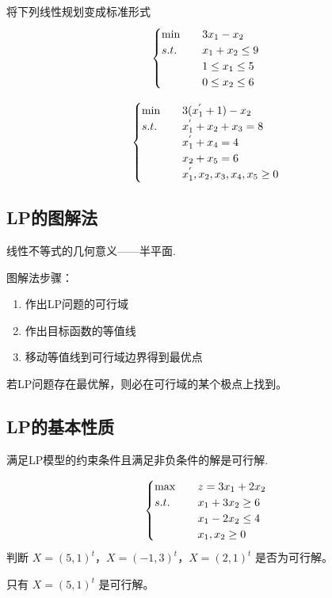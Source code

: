 \begin{example}
    将下列线性规划变成标准形式
    \[
        \begin{cases}
            \min \quad &3x_1 - x_2\\
            s.t. \quad &x_1 + x_2 \le 9\\
            &1 \le x_1 \le 5\\
            &0 \le x_2 \le 6
        \end{cases}  
    \]

    \answer
    \[
        \begin{cases}
            \min \quad &3(x_1^{'} + 1) - x_2\\
            s.t. \quad &x_1^{'} + x_2 + x_3 = 8\\
            &x_1^{'} + x_4 = 4\\
            &x_2 + x_5 = 6\\
            &x_1^{'}, x_2, x_3, x_4, x_5 \ge 0
        \end{cases}
    \]  
\end{example}

\subsection{LP的图解法}
\begin{note}
    线性不等式的几何意义——半平面.

    图解法步骤：
    \begin{enumerate}
        \item 作出LP问题的可行域
        \item 作出目标函数的等值线
        \item 移动等值线到可行域边界得到最优点
    \end{enumerate}
\end{note}

\begin{theorem}
    若LP问题存在最优解，则必在可行域的某个极点上找到。
\end{theorem}

\subsection{LP的基本性质}
\begin{definition}[可行解]
    满足LP模型的约束条件且满足非负条件的解是可行解.
\end{definition}

\begin{example}
    \[
        \begin{cases}
            \max \quad &z = 3x_1 + 2x_2\\
            s.t. \quad &x_1 + 3x_2 \ge 6\\
            &x_1 - 2x_2 \le 4\\
            &x_1, x_2 \ge 0
        \end{cases}
    \]
    判断 $X = (5, 1)^t$，$X = (-1, 3)^t$，$X = (2, 1)^t$ 是否为可行解。

    \answer 只有 $X = (5, 1)^t$ 是可行解。
\end{example}

